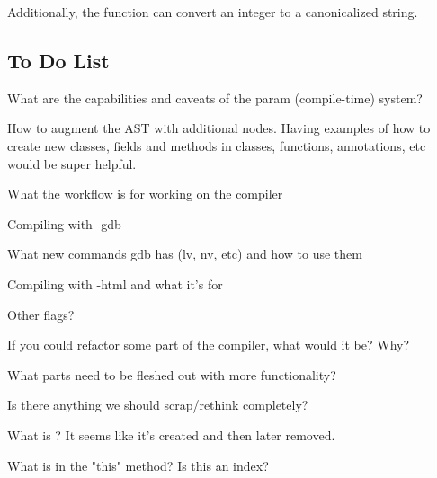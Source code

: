 \documentclass[10pt]{article}
\begin{document}
Additionally, the function  can convert an integer to a
canonicalized string.

\subsection{To Do List}

What are the capabilities and caveats of the param (compile-time) system?

How to augment the AST with additional nodes.  Having examples of how
to create new classes, fields and methods in classes, functions,
annotations, etc would be super helpful.

What the workflow is for working on the compiler

Compiling with -gdb

What new commands gdb has (lv, nv, etc) and how to use them

Compiling with -html and what it's for

Other flags?

If you could refactor some part of the compiler, what would it be?  Why?

What parts need to be fleshed out with more functionality?

Is there anything we should scrap/rethink completely?


What is ?  It seems like it's created and then
later removed.

What is  in the "this" method?  Is this an index?
\end{document}
